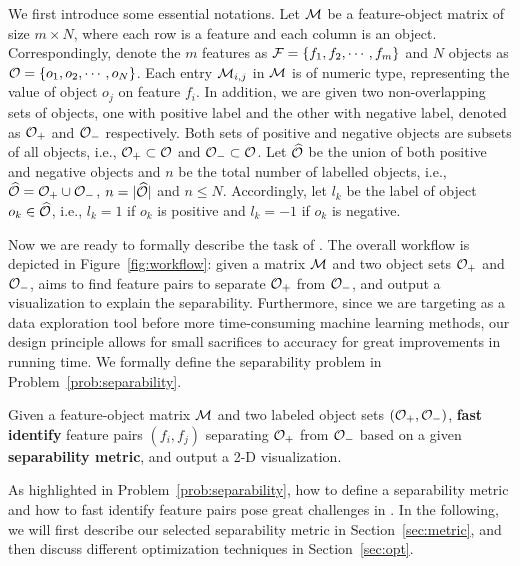 We first introduce some essential notations. Let $\mm$ be a feature-object matrix of size $m\times N$, where each row is a feature and each column is an object. Correspondingly, denote the $m$ features as $\ff=\{f_1,f_2,\cdots,f_m\}$ and $N$ objects as $\oo=\{o_1,o_2,\cdots,o_N\}$. Each entry $\mm_{i,j}$ in $\mm$ is of numeric type, representing the value of object $o_j$ on feature $f_i$. In addition, we are given two non-overlapping sets of objects, one with positive label and the other with negative label, denoted as $\oo_+$ and $\oo_-$ respectively. Both sets of positive and negative objects are subsets of all objects, i.e., $\oo_+\subset \oo$ and $\oo_-\subset \oo$. Let $\widehat{\oo}$ be the union of both positive and negative objects and $n$ be the total number of labelled objects, i.e., $\widehat{\oo}=\oo_+\cup \oo_-$, $n=|\widehat{\oo}|$ and $n\leq N$. Accordingly, let $l_k$ be the label of object $o_k\in \widehat{\oo}$, i.e., $l_k=1$ if $o_k$ is positive and $l_k=-1$ if $o_k$ is negative. 

Now we are ready to formally describe the task of \genviz. The overall workflow is depicted in Figure~\ref{fig:workflow}: given a matrix $\mm$ and two object sets $\oo_+$ and $\oo_-$, \genviz aims to find feature pairs to separate $\oo_+$ from $\oo_-$, and output a visualization to explain the separability. Furthermore, since we are targeting as a data exploration tool before more time-consuming machine learning methods, our design principle allows for small sacrifices to accuracy for great improvements in running time. We formally define the separability problem in Problem~\ref{prob:separability}. 




\begin{formulation}[Separability]\label{prob:separability}
Given a feature-object matrix $\mm$ and two labeled object sets $(\oo_+,\oo_-)$, \textbf{fast identify} \topk feature pairs $(f_i,f_j)$ separating $\oo_+$ from $\oo_-$ based on a given \textbf{separability metric}, and output a 2-D {visualization}.
\end{formulation}


As highlighted in Problem~\ref{prob:separability}, how to define a separability metric and how to fast identify \topk feature pairs pose great challenges in \genviz. In the following, we will first describe our selected separability metric in Section~\ref{sec:metric}, and then discuss different optimization techniques in Section~\ref{sec:opt}.




